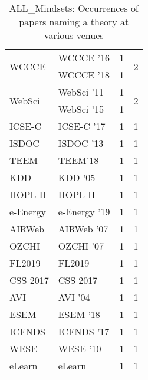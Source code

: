 \begin{table*}[t]
\begin{tabular}{llrr}
\multirow{2}{*}{WCCCE } & WCCCE '16 & 1 & \multirow{2}{*}{2}\\
& WCCCE '18 & 1 &\\
\multirow{2}{*}{WebSci } & WebSci '11 & 1 & \multirow{2}{*}{2}\\
& WebSci '15 & 1 &\\
\multirow{1}{*}{ICSE-C } & ICSE-C '17 & 1 & \multirow{1}{*}{1}\\
\multirow{1}{*}{ISDOC } & ISDOC '13 & 1 & \multirow{1}{*}{1}\\
\multirow{1}{*}{TEEM} & TEEM'18 & 1 & \multirow{1}{*}{1}\\
\multirow{1}{*}{KDD } & KDD '05 & 1 & \multirow{1}{*}{1}\\
\multirow{1}{*}{HOPL-II} & HOPL-II & 1 & \multirow{1}{*}{1}\\
\multirow{1}{*}{e-Energy } & e-Energy '19 & 1 & \multirow{1}{*}{1}\\
\multirow{1}{*}{AIRWeb } & AIRWeb '07 & 1 & \multirow{1}{*}{1}\\
\multirow{1}{*}{OZCHI } & OZCHI '07 & 1 & \multirow{1}{*}{1}\\
\multirow{1}{*}{FL2019} & FL2019 & 1 & \multirow{1}{*}{1}\\
\multirow{1}{*}{CSS 2017} & CSS 2017 & 1 & \multirow{1}{*}{1}\\
\multirow{1}{*}{AVI } & AVI '04 & 1 & \multirow{1}{*}{1}\\
\multirow{1}{*}{ESEM } & ESEM '18 & 1 & \multirow{1}{*}{1}\\
\multirow{1}{*}{ICFNDS } & ICFNDS '17 & 1 & \multirow{1}{*}{1}\\
\multirow{1}{*}{WESE } & WESE '10 & 1 & \multirow{1}{*}{1}\\
\multirow{1}{*}{eLearn} & eLearn & 1 & \multirow{1}{*}{1}\\
\end{tabular}
\caption{ALL\_Mindsets: Occurrences of papers naming a theory at various venues}
\end{table*}
